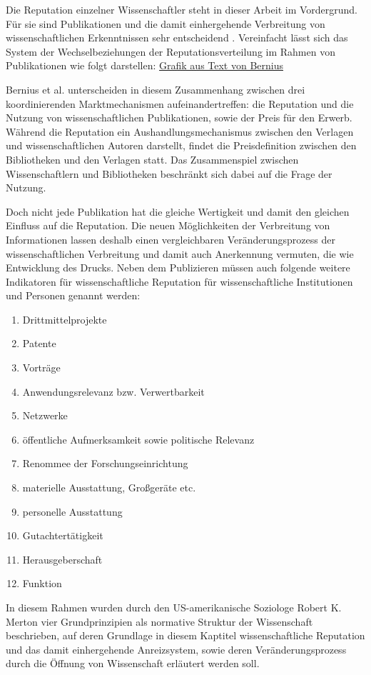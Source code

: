 Die Reputation einzelner Wissenschaftler steht in dieser Arbeit im Vordergrund. Für sie sind Publikationen und die damit einhergehende Verbreitung von wissenschaftlichen Erkenntnissen sehr entscheidend \cite{Hess_2006}. Vereinfacht lässt sich das System der Wechselbeziehungen der Reputationsverteilung im Rahmen von Publikationen wie folgt darstellen\cite{cite:21a}: \href{http://www.eap-journal.com/archive/v39_i1_8_bernius.pdf}{Grafik aus Text von Bernius}

Bernius et al. unterscheiden in diesem Zusammenhang zwischen drei koordinierenden Marktmechanismen aufeinandertreffen: die Reputation und die Nutzung von wissenschaftlichen Publikationen, sowie der Preis für den Erwerb. Während die Reputation ein Aushandlungsmechanismus zwischen den Verlagen und wissenschaftlichen Autoren darstellt, findet die Preisdefinition zwischen den Bibliotheken und den Verlagen statt. Das Zusammenspiel zwischen Wissenschaftlern und Bibliotheken beschränkt sich dabei auf die Frage der Nutzung.\cite{cite:21a}

Doch nicht jede Publikation hat die gleiche Wertigkeit\cite{suchen} und damit den gleichen Einfluss auf die Reputation. Die neuen Möglichkeiten der Verbreitung von Informationen lassen deshalb einen vergleichbaren Veränderungsprozess der wissenschaftlichen Verbreitung und damit auch Anerkennung vermuten, die wie Entwicklung des Drucks.\cite{hanekop_2006} Neben dem Publizieren müssen auch folgende weitere Indikatoren für wissenschaftliche Reputation für wissenschaftliche Institutionen und Personen genannt werden\cite{hanekop_2008}:
\begin{enumerate}
\item Drittmittelprojekte
\item Patente
\item Vorträge
\item Anwendungsrelevanz bzw. Verwertbarkeit
\item Netzwerke
\item öffentliche Aufmerksamkeit sowie politische Relevanz 
\item Renommee der Forschungseinrichtung
\item materielle Ausstattung, Großgeräte etc.
\item personelle Ausstattung
\item Gutachtertätigkeit
\item Herausgeberschaft
\item Funktion
\end{enumerate}
In diesem Rahmen wurden durch den US-amerikanische Soziologe Robert K. Merton vier Grundprinzipien als normative Struktur der Wissenschaft beschrieben\cite{Merton_1985}, auf deren Grundlage in diesem Kaptitel wissenschaftliche Reputation und das damit einhergehende Anreizsystem, sowie deren Veränderungsprozess durch die Öffnung von Wissenschaft erläutert werden soll. 

